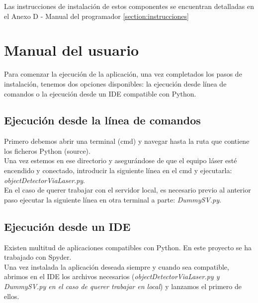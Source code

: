 Las instrucciones de instalación de estos componentes se encuentran detalladas en el Anexo D - Manual del programador \ref{section:instrucciones}

\section{Manual del usuario}

Para comenzar la ejecución de la aplicación, una vez completados los pasos de instalación, tenemos dos opciones disponibles: la ejecución desde línea de comandos o la ejecución desde un IDE compatible con Python. \\

\subsection{Ejecución desde la línea de comandos}
Primero debemos abrir una terminal (cmd) y navegar hasta la ruta que contiene los ficheros Python (source).\\
Una vez estemos en ese directorio y asegurándose de que el equipo láser esté encendido y conectado, introducir la siguiente línea en el cmd y ejecutarla: \textit{objectDetectorViaLaser.py}.\\
En el caso de querer trabajar con el servidor local, es necesario previo al anterior paso ejecutar la siguiente línea en otra terminal a parte: \textit{DummySV.py}.

\subsection{Ejecución desde un IDE}
Existen multitud de aplicaciones compatibles con Python. En este proyecto se ha trabajado con Spyder.\\
Una vez instalada la aplicación deseada siempre y cuando sea compatible, abrimos en el IDE los archivos necesarios (\textit{objectDetectorViaLaser.py y DummySV.py en el caso de querer trabajar en local}) y lanzamos el primero de ellos.\\


